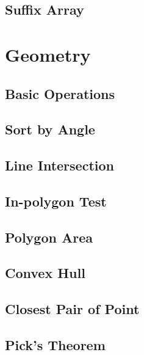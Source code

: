\documentclass[twocolumn]{article}
\begin{document}
\subsection{Suffix Array}


\section{Geometry}

\subsection{Basic Operations}


\subsection{Sort by Angle}


\subsection{Line Intersection}


\subsection{In-polygon Test}


\subsection{Polygon Area}


\subsection{Convex Hull}


\subsection{Closest Pair of Point}


\subsection{Pick's Theorem}
\end{document}
